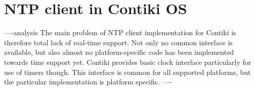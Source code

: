 
\chapter{NTP client in Contiki OS}

----analysis
The main problem of NTP client implementation for Contiki is therefore total
lack of real-time support.
Not only no common interface is available, but also
almost no platform-specific code has been implemented towards time support yet.
Contiki provides basic clock interface particularly for use of timers though.
This interface is common for all supported platforms,
but the particular implementation is platform specific.
----









